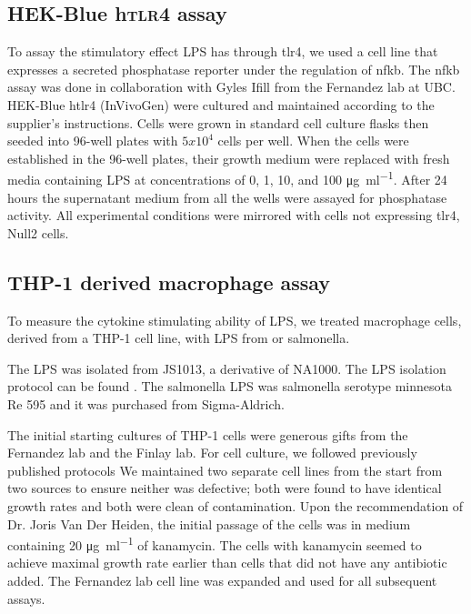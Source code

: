 \subsection{HEK-Blue h\textsc{tlr4} assay}\label{sec:hek-blue-htlr4}
To assay the stimulatory effect \caulobacter{} \ac{LPS}  has through \ac{tlr4}, we used a cell line that expresses a secreted phosphatase reporter under the regulation of \ac{nfkb}.
The \ac{nfkb} assay was done in  collaboration with Gyles Ifill from the Fernandez lab at UBC. HEK-Blue h\ac{tlr4}\texttrademark{} (InVivoGen) were cultured and maintained according to the supplier's instructions. Cells were grown in standard cell culture flasks then seeded into 96-well plates with $5x10^{4}$ cells per well. When the cells were established in the 96-well plates, their growth medium were replaced with fresh media containing \ac{LPS} at concentrations of 0, 1, 10, and 100 \si{\micro\gram\per\milli\litre}. After 24 hours the supernatant medium from all the wells were assayed for phosphatase activity. All experimental conditions were mirrored with cells not expressing \ac{tlr4}, Null2 cells\texttrademark{}.
      
\subsection{THP-1 derived macrophage assay} \label{sec:thp-1-derived}
To measure the cytokine stimulating ability of \caulobacter{} \ac{LPS}, we treated macrophage cells, derived from a THP-1 cell line, with \ac{LPS} from \caulobacter{} or \ac{salmonella}. 
      
The \caulobacter{} \ac{LPS} was isolated from \caulobacter{} JS1013, a derivative of NA1000. The \ac{LPS} isolation protocol can be found . The \ac{salmonella} \ac{LPS} was \ac{salmonella} serotype minnesota Re 595 and it was purchased from Sigma-Aldrich.
      
The initial starting cultures of THP-1 cells were generous gifts from the Fernandez lab and the Finlay lab. For cell culture, we followed previously published protocols We maintained two separate cell lines from the start from two sources to ensure neither was defective; both were found to have identical growth rates and both were clean of contamination. Upon the recommendation of Dr. Joris Van Der Heiden, the initial passage of the cells was in medium containing 20 \si{\micro\gram\per\milli\litre} of kanamycin. The cells with kanamycin seemed to achieve maximal growth rate earlier than cells that did not have any antibiotic added. The Fernandez lab cell line was expanded and used for all subsequent assays.
      
